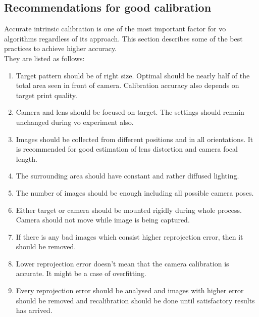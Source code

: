 \subsection{Recommendations for good calibration}
Accurate intrinsic calibration is one of the most important factor for \acrshort{vo} algorithms regardless of its approach. This section describes some of the best practices to achieve higher accuracy. \\
\newline They are listed as follows:
\begin{enumerate}
	\item Target pattern should be of right size. Optimal should be nearly half of the total area seen in front of camera. Calibration accuracy also depends on target print quality.
	\item Camera and lens should be focused on target. The settings should remain unchanged during \acrshort{vo} experiment also. 
	\item Images should be collected from different positions and in all orientations. It is recommended for good estimation of lens distortion and camera focal length.
	\item The surrounding area should have constant and rather diffused lighting. 
	\item The number of images should be enough including all possible camera poses.
	\item Either target or camera should be mounted rigidly during whole process. Camera should not move while image is being captured.
	\item If there is any bad images which consist higher reprojection error, then it should be removed.
	\item Lower reprojection error doesn't mean that the camera calibration is accurate. It might be a case of overfitting. 
	\item Every reprojection error should be analysed and images with higher error should be removed and recalibration should be done until satisfactory results has arrived.
\end{enumerate}

